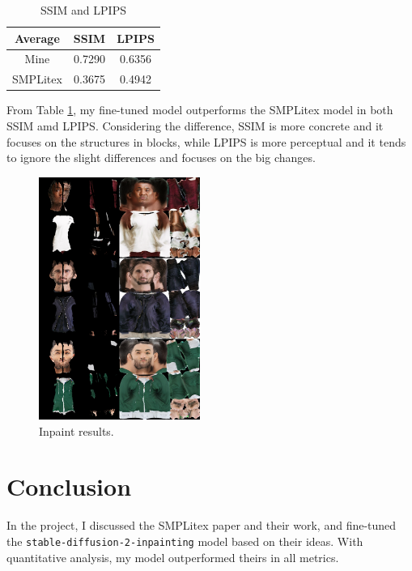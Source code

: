 \documentclass[acmtog]{acmart}
\begin{document}
\begin{table}[h]
  \caption{SSIM and LPIPS}
  \label{tbl:results}
  \begin{tabular}{ccc}
    \toprule
    Average & SSIM & LPIPS \\
    \midrule
    Mine & 0.7290 & 0.6356 \\
    SMPLitex & 0.3675 & 0.4942 \\
    \bottomrule
  \end{tabular}
\end{table}

From Table \ref{tbl:results}, my fine-tuned model outperforms the SMPLitex model in both SSIM amd LPIPS. Considering the difference, SSIM is more concrete and it focuses on the structures in blocks, while LPIPS is more perceptual and it tends to ignore the slight differences and focuses on the big changes.

\begin{figure}[h]
  \centering
  \includegraphics[width=0.47\textwidth]{figs/inpaint_results.png}
  \caption{Inpaint results.}
  \label{fig:inpaint_result}
\end{figure}

\section{Conclusion}

In the project, I discussed the SMPLitex paper and their work, and fine-tuned the \texttt{stable-diffusion-2-inpainting} model based on their ideas. With quantitative analysis, my model outperformed theirs in all metrics.
\end{document}
